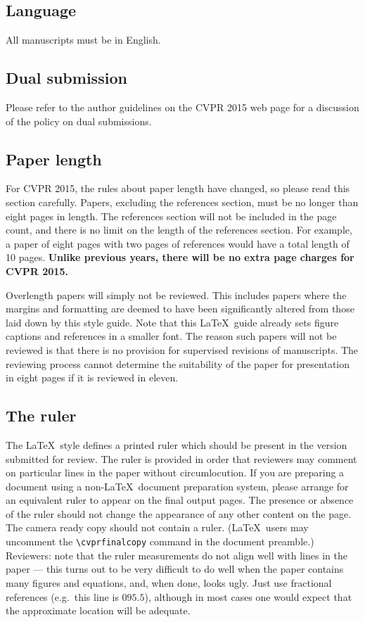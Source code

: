 \documentclass[10pt,twocolumn,letterpaper]{article}
\begin{document}
\subsection{Language}

All manuscripts must be in English.

\subsection{Dual submission}

Please refer to the author guidelines on the CVPR 2015 web page for a
discussion of the policy on dual submissions.

\subsection{Paper length}
For CVPR 2015, the rules about paper length have changed, so please
read this section carefully. Papers, excluding the references section,
must be no longer than eight pages in length. The references section
will not be included in the page count, and there is no limit on the
length of the references section. For example, a paper of eight pages
with two pages of references would have a total length of 10 pages.
{\bf Unlike previous years, there will be no extra page charges for
  CVPR 2015.}

Overlength papers will simply not be reviewed.  This includes papers
where the margins and formatting are deemed to have been significantly
altered from those laid down by this style guide.  Note that this
\LaTeX\ guide already sets figure captions and references in a smaller font.
The reason such papers will not be reviewed is that there is no provision for
supervised revisions of manuscripts.  The reviewing process cannot determine
the suitability of the paper for presentation in eight pages if it is
reviewed in eleven.  

\subsection{The ruler}
The \LaTeX\ style defines a printed ruler which should be present in the
version submitted for review.  The ruler is provided in order that
reviewers may comment on particular lines in the paper without
circumlocution.  If you are preparing a document using a non-\LaTeX\
document preparation system, please arrange for an equivalent ruler to
appear on the final output pages.  The presence or absence of the ruler
should not change the appearance of any other content on the page.  The
camera ready copy should not contain a ruler. (\LaTeX\ users may uncomment
the \verb'\cvprfinalcopy' command in the document preamble.)  Reviewers:
note that the ruler measurements do not align well with lines in the paper
--- this turns out to be very difficult to do well when the paper contains
many figures and equations, and, when done, looks ugly.  Just use fractional
references (e.g.\ this line is $095.5$), although in most cases one would
expect that the approximate location will be adequate.
\end{document}
